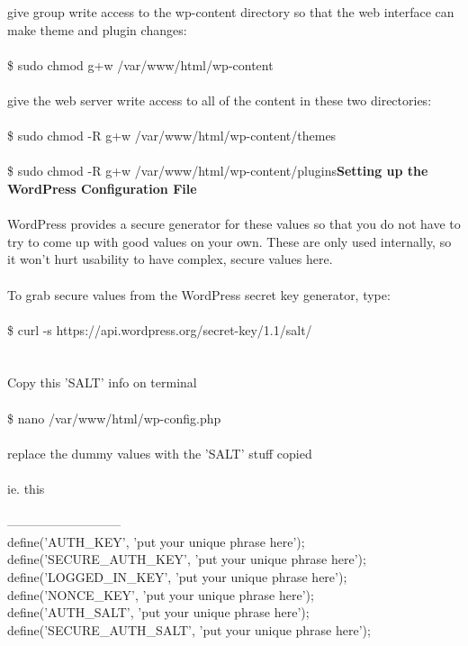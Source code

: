 \documentclass[10pt,a4paper]{article}
\begin{document}
{{{{{{{{{{{{{{{{{{{{give group write access to the wp-content directory so that the web interface can make theme and plugin changes:\\
\\
\$ sudo chmod g+w /var/www/html/wp-content}{\large \\
\\
give the web server write access to all of the content in these two directories:\\
\\
\$ sudo chmod -R g+w /var/www/html/wp-content/themes}{\large \\
\\
\$ sudo chmod -R g+w /var/www/html/wp-content/plugins}{\large \textbf{Setting up the WordPress Configuration File}}{\large \\
\\
 WordPress provides a secure generator for these values so that you do not have to try to come up with good values on your own. These are only used internally, so it won't hurt usability to have complex, secure values here.\\
\\
To grab secure values from the WordPress secret key generator, type:\\
\\
\$ curl -s https://api.wordpress.org/secret-key/1.1/salt/}{\large \\
\\
\\
Copy this 'SALT' info on terminal\\
\\
\$ nano /var/www/html/wp-config.php}{\large \\
\\
replace the dummy values with the 'SALT' stuff copied\\
\\
ie. this\\
\\
---------------------------\\
define('AUTH\_KEY',         'put your unique phrase here');\\
define('SECURE\_AUTH\_KEY',  'put your unique phrase here');\\
define('LOGGED\_IN\_KEY',    'put your unique phrase here');\\
define('NONCE\_KEY',        'put your unique phrase here');\\
define('AUTH\_SALT',        'put your unique phrase here');\\
define('SECURE\_AUTH\_SALT', 'put your unique phrase here');\\
}}}}}}}}}}}}}}}}}}}}
\end{document}
